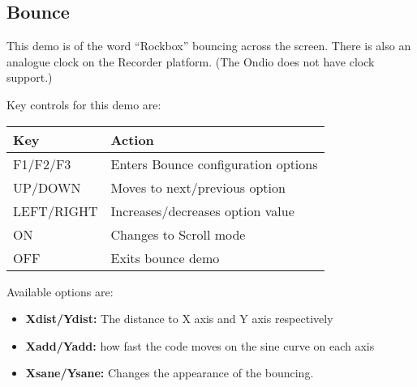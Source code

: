 \subsection{Bounce}

This demo is of the word ``Rockbox'' bouncing across the screen.  There
is also an analogue clock on the Recorder platform.  (The Ondio does
not have clock support.)

Key controls for this demo are:

\begin{table}[h!]
\begin{center}
\begin{tabular}{@{}ll@{}}\toprule
\textbf{Key} & \textbf{Action} \\\midrule
F1/F2/F3 & Enters Bounce configuration options \\
UP/DOWN & Moves to next/previous option \\
LEFT/RIGHT & Increases/decreases option value \\
ON & Changes to Scroll mode \\
OFF & Exits bounce demo\\\bottomrule
\end{tabular}
\end{center}
\end{table}
Available options are:

\begin{itemize}
\item \textbf{Xdist/Ydist:} The distance to X axis and Y axis
respectively
\item \textbf{Xadd/Yadd:} how fast the code moves on the sine curve on
each axis
\item \textbf{Xsane/Ysane:} Changes the appearance of the bouncing.
\end{itemize}
